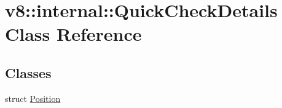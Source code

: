 \hypertarget{classv8_1_1internal_1_1_quick_check_details}{}\section{v8\+:\+:internal\+:\+:Quick\+Check\+Details Class Reference}
\label{classv8_1_1internal_1_1_quick_check_details}
\subsection*{Classes}
\begin{DoxyCompactItemize}
\item 
struct \hyperlink{structv8_1_1internal_1_1_quick_check_details_1_1_position}{Position}
\end{DoxyCompactItemize}
